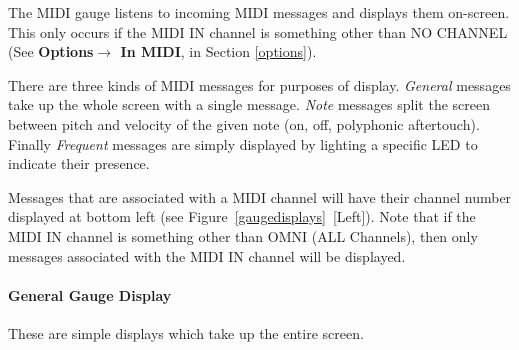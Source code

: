 \documentclass{article}
\begin{document}
The MIDI gauge listens to incoming MIDI messages and displays them on-screen.  This only occurs if the MIDI IN channel is something other than NO CHANNEL (See {\bf Options\(\boldsymbol\rightarrow\) In MIDI}, in Section \ref{options}).



There are three kinds of MIDI messages for purposes of display.  {\it General} messages take up the whole screen with a single message.  {\it Note} messages split the screen between pitch and velocity of the given note (on, off, polyphonic aftertouch).  Finally {\it Frequent} messages are simply displayed by lighting a specific LED to indicate their presence. 


Messages that are associated with a MIDI channel will have their channel number displayed at bottom left (see Figure~\ref{gaugedisplays}~[Left]).  Note that if the MIDI IN channel is something other than OMNI (ALL Channels), then only messages associated with the MIDI IN channel will be displayed.






\paragraph{General Gauge Display}  These are simple displays which take up the entire screen.
\end{document}
